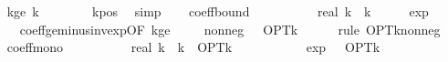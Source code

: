 \begin{isabellebody}
\isanewline
\isanewline
\ \ \isamarkupfalse%
\ k{\isacharunderscore}{\kern0pt}ge{}{\isacharcolon}{\kern0pt}\ {\isachardoublequoteopen}k\ {\isasymge}\ {}{\isachardoublequoteclose}\isanewline
\ \ \ \ \isamarkupfalse%
\ k{\isacharunderscore}{\kern0pt}pos\ \isamarkupfalse%
\ simp\isanewline
\isanewline
\ \ \isamarkupfalse%
\ coeff{\isacharunderscore}{\kern0pt}bound{\isacharcolon}{\kern0pt}\isanewline
\ \ \ \ {\isachardoublequoteopen}{}\ {\isacharminus}{\kern0pt}\ {\isacharparenleft}{\kern0pt}{}\ {\isacharminus}{\kern0pt}\ {}\ {\isacharslash}{\kern0pt}\ real\ k{\isacharparenright}{\kern0pt}\ {\isacharcircum}{\kern0pt}\ k\ {\isasymge}\ {}\ {\isacharminus}{\kern0pt}\ {}\ {\isacharslash}{\kern0pt}\ exp\ {}{\isachardoublequoteclose}\isanewline
\ \ \ \ \isamarkupfalse%
\ coeff{\isacharunderscore}{\kern0pt}ge{\isacharunderscore}{\kern0pt}{}{\isacharunderscore}{\kern0pt}minus{\isacharunderscore}{\kern0pt}inv{\isacharunderscore}{\kern0pt}exp{\isacharbrackleft}{\kern0pt}OF\ k{\isacharunderscore}{\kern0pt}ge{}{\isacharbrackright}{\kern0pt}\ \isakeywordONE{{\isachardot}{\kern0pt}}\isamarkupfalse%
\isanewline
\isanewline
\ \ \isamarkupfalse%
\ nonneg{\isacharcolon}{\kern0pt}\ {\isachardoublequoteopen}{}\ {\isasymle}\ OPT{\isacharunderscore}{\kern0pt}k{\isachardoublequoteclose}\isanewline
\ \ \ \ \isamarkupfalse%
\ {\isacharparenleft}{\kern0pt}rule\ OPT{\isacharunderscore}{\kern0pt}k{\isacharunderscore}{\kern0pt}nonneg{\isacharparenright}{\kern0pt}\isanewline
\isanewline
\ \ \isamarkupfalse%
\ coeff{\isacharunderscore}{\kern0pt}mono{\isacharcolon}{\kern0pt}\isanewline
\ \ \ \ {\isachardoublequoteopen}{\isacharparenleft}{\kern0pt}{}\ {\isacharminus}{\kern0pt}\ {\isacharparenleft}{\kern0pt}{}\ {\isacharminus}{\kern0pt}\ {}\ {\isacharslash}{\kern0pt}\ real\ k{\isacharparenright}{\kern0pt}\ {\isacharcircum}{\kern0pt}\ k{\isacharparenright}{\kern0pt}\ {\isacharasterisk}{\kern0pt}\ OPT{\isacharunderscore}{\kern0pt}k\isanewline
\ \ \ \ \ \ {\isasymge}\ {\isacharparenleft}{\kern0pt}{}\ {\isacharminus}{\kern0pt}\ {}\ {\isacharslash}{\kern0pt}\ exp\ {}{\isacharparenright}{\kern0pt}\ {\isacharasterisk}{\kern0pt}\ OPT{\isacharunderscore}{\kern0pt}k{\isachardoublequoteclose}\isanewline
\ \ \ \ \isamarkupfalse%

\end{isabellebody}
